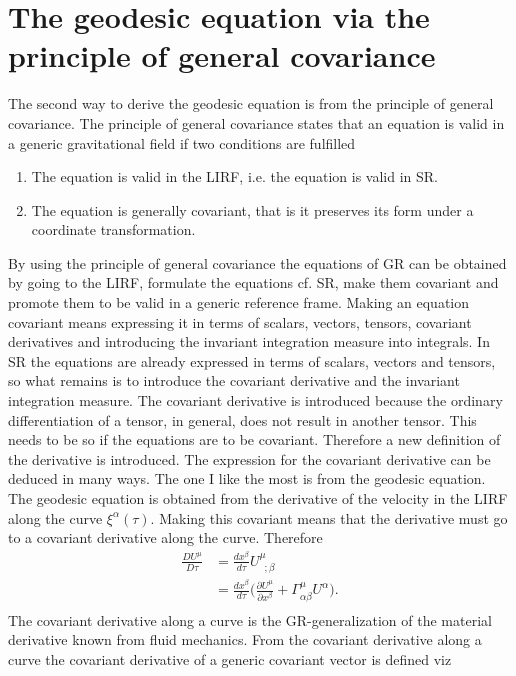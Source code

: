 \section{The geodesic equation via the principle of general covariance}
The second way to derive the geodesic equation is from the principle of general covariance. The principle of general covariance states that an equation is valid in a generic gravitational field if two conditions are fulfilled
\begin{enumerate}
	\item The equation is valid in the LIRF, i.e. the equation is valid in SR. 
	\item The equation is generally covariant, that is it preserves its form under a coordinate transformation. 
\end{enumerate}
By using the principle of general covariance the equations of GR can be obtained by going to the LIRF, formulate the equations cf. SR, make them covariant and promote them to be valid in a generic reference frame. Making an equation covariant means expressing it in terms of scalars, vectors, tensors, covariant derivatives and introducing the invariant integration measure into integrals. In SR the equations are already expressed in terms of scalars, vectors and tensors, so what remains is to introduce the covariant derivative and the invariant integration measure. The covariant derivative is introduced because the ordinary differentiation of a tensor, in general, does not result in another tensor. This needs to be so if the equations are to be covariant. Therefore a new definition of the derivative is introduced. The expression for the covariant derivative can be deduced in many ways. The one I like the most is from the geodesic equation. The geodesic equation is obtained from the derivative of the velocity in the LIRF along the curve $\xi^\alpha(\tau)$. Making this covariant means that the derivative must go to a covariant derivative along the curve. Therefore
\begin{equation}
	\begin{split}
		\frac{DU^\mu}{D\tau}&=\frac{d x^\beta}{d\tau}U^\mu_{\,\,\,;\beta}\\
		&=\frac{d x^\beta}{d\tau}\bigg(\frac{\partial U^\mu}{\partial x^\beta}+\Gamma^\mu_{\alpha\beta}U^\alpha\bigg).\\
	\end{split}
\end{equation} 
The covariant derivative along a curve is the GR-generalization of the material derivative known from fluid mechanics. From the covariant derivative along a curve the covariant derivative of a generic covariant vector is defined viz
